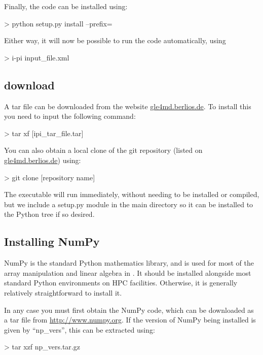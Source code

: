 \documentclass[11pt,english,fleqn]{report}
\newenvironment{code}{%
\footnotesize 
\verbatim
}{
\endverbatim
\normalsize
}
\begin{document}
Finally, the code can be installed using:

\begin{code}
> python setup.py install --prefix=~
\end{code}

Either way, it will now be possible to run the code automatically, using

\begin{code}
> i-pi input_file.xml
\end{code}

\subsection{\ipi download}

A tar file can be downloaded from the website \url{gle4md.berlios.de}.
To install this you need to input the following command:

\begin{code}
> tar xf [ipi_tar_file.tar]
\end{code}


You can also obtain a local clone of the git repository (listed on \url{gle4md.berlios.de}) using:

\begin{code}
> git clone [repository name]
\end{code}

The \ipi executable will run immediately, without needing to be installed
or compiled, but we include a setup.py module in the main directory so it can
be installed to the Python tree if so desired.

\subsection{Installing NumPy}

NumPy is the standard Python mathematics library, and is used for
most of the array manipulation and linear algebra in \ipi. It should
be installed alongside most standard Python environments on HPC facilities.
Otherwise, it is generally relatively straightforward to install it. 

In any case you must first obtain the NumPy code, which can be downloaded
as a tar file from \url{http://www.numpy.org}. If the version of
NumPy being installed is given by {}``np\_vers'', this can be extracted
using:

\begin{code}
> tar xzf np_vers.tar.gz
\end{code}
\end{document}
